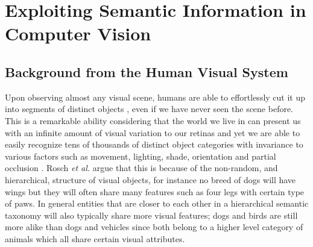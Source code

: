 \documentclass[12pt]{report}
\begin{document}
\section{Exploiting Semantic Information in Computer Vision}

\subsection{Background from the Human Visual System}

Upon observing almost any visual scene, humans are able to effortlessly cut it up into segments of distinct objects \cite{Rosch1976}, even if we have never seen the scene before. This is a remarkable ability considering that the world we live in can present us with an infinite amount of visual variation to our retinas and yet we are able to easily recognize tens of thousands of distinct object categories \cite{Biederman1989} with invariance to various factors such as movement, lighting, shade, orientation and partial occlusion \cite{DiCarlo2012}. Rosch \textit{et al.} \cite{Rosch1976} argue that this is because of the non-random, and hierarchical, structure of visual objects, for instance no breed of dogs will have wings but they will often share many features such as four legs with certain type of paws. In general entities that are closer to each other in a hierarchical semantic taxonomy will also typically share more visual features; dogs and birds are still more alike than dogs and vehicles since both belong to a higher level category of animals which all share certain visual attributes.
\end{document}
